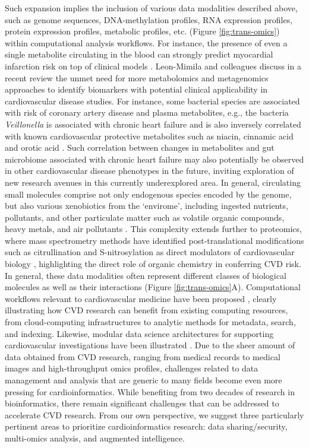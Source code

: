 \documentclass[letter]{bib}
\begin{document}
	Such expansion implies the inclusion of various data modalities described above, such as genome sequences, DNA-methylation profiles, RNA expression profiles, protein expression profiles, metabolic profiles, etc. (Figure \ref{fig:trans-omics}) within computational analysis workflows.  For instance, the presence of even a single metabolite circulating in the blood can strongly predict myocardial infarction risk on top of clinical models \citep{mcgarrah:2018:cardiovascular}.  Leon-Mimila and colleagues discuss in a recent review \citep{Leon-Mimila:2019:Relevance} the unmet need for more metabolomics and metagenomics approaches to identify biomarkers with potential clinical applicability in cardiovascular disease studies.  For instance, some bacterial species are associated with risk of coronary artery disease and plasma metabolites, e.g., the bacteria \emph{Veillonella} is associated with chronic heart failure and is also inversely correlated with known cardiovascular protective metabolites such as niacin, cinnamic acid and orotic acid \citep{Cui:2018:Metagenomic}.  Such correlation between changes in metabolites and gut microbiome associated with chronic heart failure may also potentially be observed in other cardiovascular disease phenotypes in the future, inviting exploration of new research avenues in this currently underexplored area.  In general, circulating small molecules comprise not only endogenous species encoded by the genome, but also various xenobiotics from the `envirome', including ingested nutrients, pollutants, and other particulate matter such as volatile organic compounds, heavy metals, and air pollutants \citep{Lau:2018:Omics,Riggs:2018:Defining,Brook:2010:Particulate}.  This complexity extends further to proteomics, where mass spectrometry methods have identified post-translational modifications such as citrullination and S-nitrosylation as direct modulators of cardiovascular biology \citep{Fert-Bober:2018:Precision}, highlighting the direct role of organic chemistry \citep{McMahon:2017:Survival} in conferring CVD risk.  In general, these data modalities often represent different classes of biological molecules as well as their interactions (Figure \ref{fig:trans-omics}A). Computational workflows relevant to cardiovascular medicine have been proposed \citep{Ping:2018:Biomedical}, clearly illustrating how CVD research can benefit from existing computing resources, from cloud-computing infrastructures to analytic methods for metadata, search, and indexing. Likewise, modular data science architectures for supporting cardiovascular investigations have been illustrated \citep{Khomtchouk:2019:HeartBioPortal,Scruggs:2015:harnessing}.  Due to the sheer amount of data obtained from CVD research, ranging from medical records to medical images and high-throughput omics profiles, challenges related to data management and analysis that are generic to many fields become even more pressing for cardioinformatics. While benefiting from two decades of research in bioinformatics, there remain significant challenges that can be addressed to accelerate CVD research. From our own perspective, we suggest three particularly pertinent areas to prioritize cardioinformatics research: data sharing/security, multi-omics analysis, and augmented intelligence.
	
\end{document}
